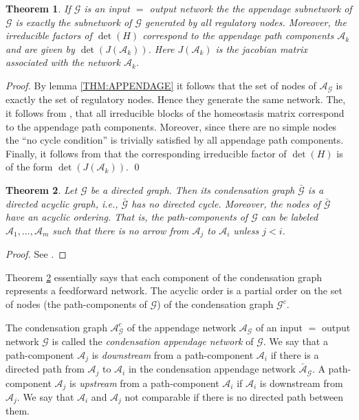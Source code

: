 \documentclass[a4paper,fleqn]{cas-dc}
\newtheorem{theorem}{Theorem}[section]
\begin{document}
\begin{theorem} \label{THM:APPENDAGE_NET}
If $\mathcal{G}$ is an input $=$ output network the the appendage subnetwork of $\mathcal{G}$ is exactly the subnetwork of $\mathcal{G}$ generated by all regulatory nodes.
Moreover, the irreducible factors of $\det(H)$ correspond to the appendage path components $\mathcal{A}_k$ and are given by $\det(J({\mathcal{A}_k}))$. 
Here $J({\mathcal{A}_k})$ is the jacobian matrix associated with the network $\mathcal{A}_k$.
\end{theorem}
\begin{proof}
By lemma \ref{THM:APPENDAGE} it follows that the set of nodes of $\mathcal{A}_\mathcal{G}$ is exactly the set of regulatory nodes. Hence they generate the same network.
The, it follows from \cite[Thm. 7.1]{wang2021},
that all irreducible blocks of the homeostasis matrix correspond to the appendage path components. Moreover, since there are no simple nodes the ``no cycle condition'' is trivially satisfied by all appendage path components.
Finally, it follows from \cite[Thm. 5.4]{wang2021} that the corresponding irreducible factor of $\det(H)$ is of the form $\det(J({\mathcal{A}_k}))$.
\qed
\end{proof}

\begin{theorem} \label{THM:ACYCLIC}
Let $\mathcal{G}$ be a directed graph.
Then its condensation graph $\bar{\mathcal{G}}$ is a \emph{directed acyclic graph}, i.e., $\bar{\mathcal{G}}$ has no directed cycle.
Moreover, the nodes of $\bar{\mathcal{G}}$ have an \emph{acyclic ordering}. That is, the path-components of $\mathcal{G}$ can be labeled $\mathcal{A}_1,\ldots,\mathcal{A}_m$ such that there is no arrow from $\mathcal{A}_j$ to $\mathcal{A}_i$ unless $j < i$.
\end{theorem}
\begin{proof}
See \cite[pgs. 18-19 and prop. 3.1.2]{bang-jensen2018}.
\end{proof}

Theorem \ref{THM:ACYCLIC} essentially says that each component of the condensation graph represents a feedforward network.
The acyclic order is a partial order on the set of nodes (the path-components of $\mathcal{G}$) of the condensation graph $\mathcal{G}^c$.

The condensation graph $\mathcal{A}_{\mathcal{G}}^c$ of the appendage network $\mathcal{A}_{\mathcal{G}}$ of an input $=$ output network $\mathcal{G}$ is called the \emph{condensation appendage network} of $\mathcal{G}$.
We say that a path-component $\mathcal{A}_j$ is \emph{downstream} from a path-component $\mathcal{A}_i$ if there is a directed path from $\mathcal{A}_j$ to $\mathcal{A}_i$ in the condensation appendage network $\bar{\mathcal{A}}_{\mathcal{G}}$.
A path-component $\mathcal{A}_j$ is \emph{upstream} from a path-component $\mathcal{A}_i$ if $\mathcal{A}_i$ is downstream from $\mathcal{A}_j$.
We say that $\mathcal{A}_i$ and $\mathcal{A}_j$ not comparable if there is no directed path between them.
\end{document}
